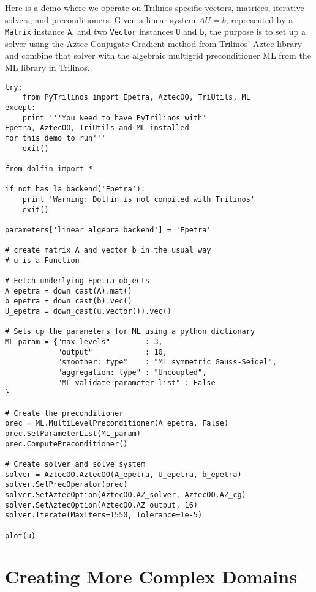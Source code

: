 Here is a demo where we operate on Trilinos-specific vectors, matrices,
iterative solvers, and preconditioners. Given a linear system
$AU=b$, represented by a {\fontsize{12pt}{12pt}\texttt{Matrix}} instance {\fontsize{12pt}{12pt}\texttt{A}},
and two {\fontsize{12pt}{12pt}\texttt{Vector}} instances {\fontsize{12pt}{12pt}\texttt{U}} and {\fontsize{12pt}{12pt}\texttt{b}}, the purpose is to
set up a solver using the Aztec Conjugate Gradient method from
Trilinos' Aztec library and combine that solver with the 
algebraic multigrid preconditioner ML
from the ML library in Trilinos.
\begin{Verbatim}[fontsize=\fontsize{10pt}{10pt},tabsize=8,baselinestretch=1.05,
fontfamily=tt,xleftmargin=7mm]
try:
    from PyTrilinos import Epetra, AztecOO, TriUtils, ML
except:
    print '''You Need to have PyTrilinos with'
Epetra, AztecOO, TriUtils and ML installed
for this demo to run'''
    exit()

from dolfin import *

if not has_la_backend('Epetra'):
    print 'Warning: Dolfin is not compiled with Trilinos'
    exit()

parameters['linear_algebra_backend'] = 'Epetra'

# create matrix A and vector b in the usual way
# u is a Function

# Fetch underlying Epetra objects
A_epetra = down_cast(A).mat()
b_epetra = down_cast(b).vec()
U_epetra = down_cast(u.vector()).vec()

# Sets up the parameters for ML using a python dictionary
ML_param = {"max levels"        : 3,
            "output"            : 10,
            "smoother: type"    : "ML symmetric Gauss-Seidel",
            "aggregation: type" : "Uncoupled",
            "ML validate parameter list" : False
}

# Create the preconditioner
prec = ML.MultiLevelPreconditioner(A_epetra, False)
prec.SetParameterList(ML_param)
prec.ComputePreconditioner()

# Create solver and solve system
solver = AztecOO.AztecOO(A_epetra, U_epetra, b_epetra)
solver.SetPrecOperator(prec)
solver.SetAztecOption(AztecOO.AZ_solver, AztecOO.AZ_cg)
solver.SetAztecOption(AztecOO.AZ_output, 16)
solver.Iterate(MaxIters=1550, Tolerance=1e-5)

plot(u)
\end{Verbatim}
\noindent



\section{Creating More Complex Domains}
\label{langtangen:prepro}

